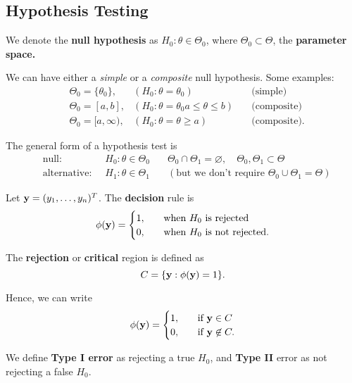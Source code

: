 

\subsection{Hypothesis Testing}

\begin{definition}
We denote the \textbf{null hypothesis} as $H_0:\theta\in\Theta_0$, where $\Theta_0\subset\Theta$, the \textbf{parameter space.}
\end{definition}

We can have either a \textit{simple} or a \textit{composite} null hypothesis. Some examples:
\begin{align*}
    &\Theta_0=\{\theta_0\}, & (H_0:\theta=\theta_0) \quad &\text{(simple)} \\
    &\Theta_0=[a,b], & (H_0:\theta=\theta_0a\leq \theta\leq b) \quad &\text{(composite)} \\ 
    &\Theta_0=[a,\infty), & (H_0:\theta=\theta\geq a) \quad &\text{(composite)}.
\end{align*}

\begin{remark}
		The general form of a hypothesis test is
\begin{align*}
    &\text{null: } \ &H_0:\theta\in \Theta_0 \quad  &\Theta_0\cap\Theta_1=\varnothing, \quad \Theta_0,\Theta_1\subset \Theta \\
    &\text{alternative: } \ &H_1:\theta\in \Theta_1 \quad &(\text{but we don't require $\Theta_0\cup \Theta_1=\Theta$})
\end{align*}
\end{remark}

\begin{definition}
Let $\mathbf y=(y_1,\dots,y_n)^T$. The \textbf{decision} rule is 
$$
\phi(\mathbf y)=\begin{cases}1, \quad &\text{when $H_0$ is rejected} \\ 0, \quad &\text{when $H_0$ is not rejected.}\end{cases}
$$
\end{definition}
\begin{definition}
The \textbf{rejection} or \textbf{critical} region is defined as
$$
C=\{\mathbf y:\phi(\mathbf y)=1\}.
$$
\end{definition}

Hence, we can write
$$
\phi(\mathbf y)=
\begin{cases}
1, \quad &\text{if }\mathbf y\in C \\
0, \quad &\text{if } \mathbf y\not \in C.
\end{cases}
$$
\begin{definition}
We define \textbf{Type I error} as rejecting a true $H_0$, and \textbf{Type II} error as not rejecting a false $H_0.$
\end{definition}

